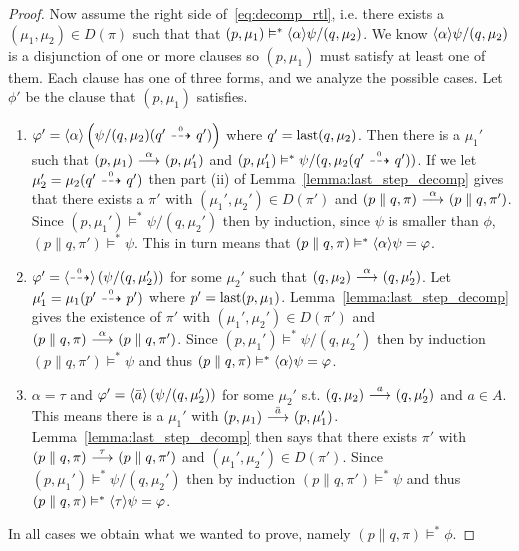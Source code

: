 \begin{proof}
    \rtl Now assume the right side of~\eqref{eq:decomp_rtl}, i.e. there exists a $(\mu_1,\mu_2)
    \in D(\pi)$ such that that $(p,\mu_1) \vDash^* \mbox{\ensuremath{\langle \alpha \rangle}}\psi / (q,\mu_2)$.
    We know $\mbox{\ensuremath{\langle \alpha \rangle}}\psi / (q,\mu_2)$ is a disjunction of one or more clauses
    so $(p,\mu_1)$ must satisfy at least one of them. Each clause has one of three
    forms, and we analyze the possible cases.
    Let $\phi'$ be the clause that $(p,\mu_1)$ satisfies.
    \begin{enumerate}
        \item $\varphi' = \mbox{\ensuremath{\langle \alpha \rangle}} \left(\psi / (q,\mu_2)(q' \ {\stackrel{_{0}}{\dashrightarrow}}\  q') \right)$
            where $q' = \operatorname{last}(q,\mu_2)$.
            Then there is a $\mu_1'$ such that $(p,\mu_1) \ {\stackrel{{\alpha}}{\longrightarrow}}\  (p,\mu_1')$
            and $(p,\mu_1') \vDash^* \psi/(q,\mu_2(q'\ {\stackrel{_{0}}{\dashrightarrow}}\ q'))$. If
            we let $\mu_2' = \mu_2(q' \ {\stackrel{_{0}}{\dashrightarrow}}\  q')$ then 
            part (ii) of
            Lemma~\ref{lemma:last_step_decomp}
            gives that there exists a $\pi'$ with $(\mu_1',\mu_2')\in D(\pi')$ and
            $(p\parallel q, \pi) \ {\stackrel{{\alpha}}{\longrightarrow}}\  (p\parallel q, \pi')$.
            Since $(p,\mu_1')
            \vDash^* \psi / (q,\mu_2')$ then by induction, since $\psi$ is smaller than
            $\phi$, $(p\parallel q, \pi') \vDash^* \psi$. This in turn means that
            $(p\parallel q, \pi) \vDash^* \mbox{\ensuremath{\langle \alpha \rangle}}\psi = \varphi$.
        \item $\varphi' = \mbox{\ensuremath{\langle\stackrel{_{0}}{\dashrightarrow}\rangle}} \left(\psi / (q,\mu_2')\right)$ for some $\mu_2'$
            such that $(q,\mu_2) \ {\stackrel{{\alpha}}{\longrightarrow}}\  (q,\mu_2')$. Let $\mu_1' = \mu_1(p'
            \ {\stackrel{_{0}}{\dashrightarrow}}\  p')$ where $p' = \operatorname{last}(p,\mu_1)$. Lemma~\ref{lemma:last_step_decomp}
            gives the existence of $\pi'$ with $(\mu_1',\mu_2')\in D(\pi')$ and $(p\parallel
            q,\pi) \ {\stackrel{{\alpha}}{\longrightarrow}}\  (p\parallel q, \pi')$. Since $(p,\mu_1')\vDash^* \psi
            / (q,\mu_2')$ then by induction $(p\parallel q,\pi') \vDash^* \psi$ and thus
            $(p\parallel q, \pi) \vDash^* \mbox{\ensuremath{\langle \alpha \rangle}}\psi = \varphi$.
        \item $\alpha = \tau$ and $\varphi' = \mbox{\ensuremath{\langle \bar{a} \rangle}} \left( \psi / (q,\mu_2') \right)$
            for some $\mu_2'$ s.t. $(q,\mu_2)\ {\stackrel{{a}}{\longrightarrow}}\ (q,\mu_2')$ and $a\in A$.
            This means there is a
            $\mu_1'$ with $(p,\mu_1) \ {\stackrel{{\bar{a}}}{\longrightarrow}}\  (p,\mu_1')$.
            Lemma~\ref{lemma:last_step_decomp} then says that there exists $\pi'$ with $(p
            \parallel q, \pi) \ {\stackrel{{\tau}}{\longrightarrow}}\  (p\parallel q, \pi')$ and $(\mu_1',\mu_2')
            \in D(\pi')$. Since $(p,\mu_1')\vDash^* \psi / (q,\mu_2')$ then by induction
            $(p\parallel q,\pi')\vDash^* \psi$ and thus $(p\parallel q, \pi) \vDash^*
            \mbox{\ensuremath{\langle \tau \rangle}}\psi = \varphi$.
    \end{enumerate}
    In all cases we obtain what we wanted to prove, namely $(p\parallel q, \pi) \vDash^* \phi$.



\end{proof}
